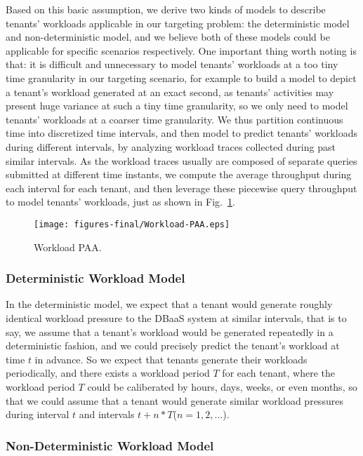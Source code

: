 Based on this basic assumption, we derive two kinds of models to describe tenants' workloads applicable in our targeting problem: the deterministic model and non-deterministic model, and we believe both of these models could be applicable for specific scenarios respectively. One important thing worth noting is that: it is difficult and unnecessary to model tenants' workloads at a too tiny time granularity in our targeting scenario, for example to build a model to depict a tenant's workload generated at an exact second, as tenants' activities may present huge variance at such a tiny time granularity, so we only need to model tenants' workloads at a coarser time granularity. We thus partition continuous time into discretized time intervals, and then model to predict tenants' workloads during different intervals, by analyzing workload traces collected during past similar intervals. As the workload traces usually are composed of separate queries submitted at different time instants, we compute the average throughput during each interval for each tenant, and then leverage these piecewise query throughput to model tenants' workloads, just as shown in Fig.~\ref{fig:PAA}.

\begin{figure}[!htb]
\centering
\texttt{[image: figures-final/Workload-PAA.eps]}
\caption{Workload PAA.}
\label{fig:PAA}
\end{figure}


\subsubsection{Deterministic Workload Model}
In the deterministic model, we expect that a tenant would generate roughly identical workload pressure to the DBaaS system at similar intervals, that is to say, we assume that a tenant's workload would be generated repeatedly in a deterministic fashion, and we could precisely predict the tenant's workload at time $t$ in advance. So we expect that tenants generate their workloads periodically, and there exists a workload period $T$ for each tenant, where the workload period $T$ could be caliberated by hours, days, weeks, or even months, so that we could assume that a tenant would generate similar workload pressures during interval $t$ and intervals $t + n * T$($n=1,2,...$).

\subsubsection{Non-Deterministic Workload Model}

